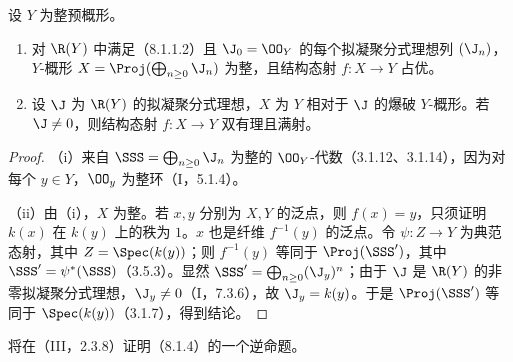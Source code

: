 设 $Y$ 为整预概形。
\begin{enumerate}[label=(\roman*)]
\item 对 $\R(Y)$ 中满足（8.1.1.2）且 $\J_0=\OO_Y$ 的每个拟凝聚分式理想列 $(\J_n)$，$Y$-概形 $X=\Proj(\bigoplus_{n\geq0}\J_n)$ 为整，且结构态射 $f:X\to Y$ 占优。
\item 设 $\J$ 为 $\R(Y)$ 的拟凝聚分式理想，$X$ 为 $Y$ 相对于 $\J$ 的爆破 $Y$-概形。若 $\J\ne0$，则结构态射 $f:X\to Y$ 双有理且满射。
\end{enumerate}
\begin{proof}
（i）来自 $\SSS=\bigoplus_{n\geq0}\J_n$ 为整的 $\OO_Y$-代数（3.1.12、3.1.14），因为对每个 $y\in Y$，$\OO_y$ 为整环（I，5.1.4）。

（ii）由（i），$X$ 为整。若 $x,y$ 分别为 $X,Y$ 的泛点，则 $f(x)=y$，只须证明 $k(x)$ 在 $k(y)$ 上的秩为 $1$。$x$ 也是纤维 $f^{-1}(y)$ 的泛点。令 $\psi:Z\to Y$ 为典范态射，其中 $Z=\Spec(k(y))$；则 $f^{-1}(y)$ 等同于 $\Proj(\SSS')$，其中 $\SSS'=\psi^*(\SSS)$（3.5.3）。显然 $\SSS'=\bigoplus_{n\geq0}(\J_y)^n$；由于 $\J$ 是 $\R(Y)$ 的非零拟凝聚分式理想，$\J_y\ne0$（I，7.3.6），故 $\J_y=k(y)$。于是 $\Proj(\SSS')$ 等同于 $\Spec(k(y))$（3.1.7），得到结论。
\end{proof}
将在（III，2.3.8）证明（8.1.4）的一个逆命题。

